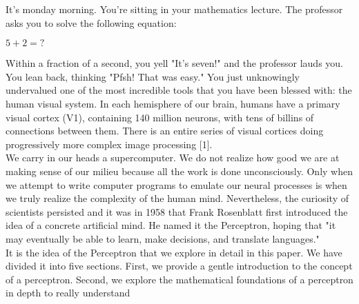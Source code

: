
	It's monday morning. You're sitting in your mathematics lecture. The professor asks you to solve the following equation:
	
	\begin{center}
		$5 + 2 = ?$
	\end{center}
	
	Within a fraction of a second, you yell "It's seven!" and the professor lauds you. You lean back, thinking "Pfsh! That was easy."   You just unknowingly undervalued one of the most incredible tools that you have been blessed with: the human visual system. In each hemisphere of our brain, humans have a primary visual cortex (V1), containing 140 million neurons, with tens of billins of connections between them. There is an entire series of visual cortices doing progressively more complex image processing [1]. \\
	
	We carry in our heads a supercomputer. We do not realize how good we are at making sense of our milieu because all the work is done unconsciously. Only when we attempt to write computer programs to emulate our neural processes is when we truly realize the complexity of the human mind. Nevertheless, the curiosity of scientists persisted and it was in 1958 that Frank Rosenblatt first introduced the idea of a concrete artificial mind. He named it the Perceptron, hoping that "it may eventually be able to learn, make decisions, and translate languages." \\
	
	It is the idea of the Perceptron that we explore in detail in this paper. We have divided it into five sections. First, we provide a gentle introduction to the concept of a perceptron. Second, we explore the mathematical foundations of a perceptron in depth to really understand 

